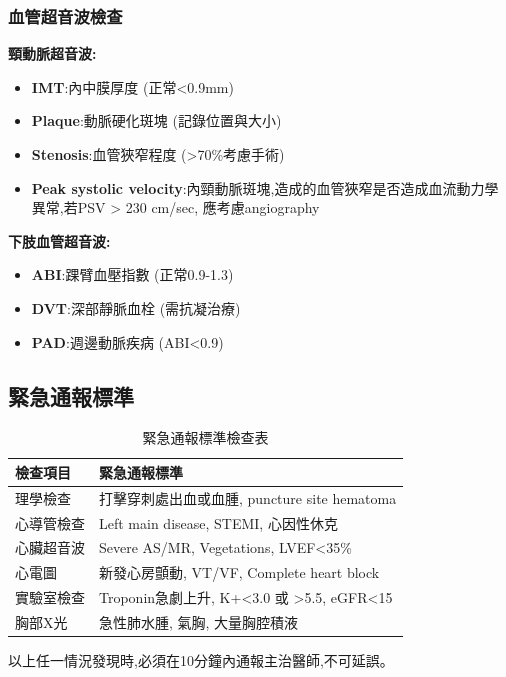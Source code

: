 \documentclass[12pt,a4paper]{article}
\newcommand{\warning}[1]{
    \par
    \noindent
    \begin{tcolorbox}[
        colback=warning_orange!5!white,
        colframe=warning_orange,
        title=\textbf{緊急通報},
        fonttitle=\bfseries,
        boxrule=1pt,
        arc=3pt,
        left=6pt,
        right=6pt,
        top=6pt,
        bottom=6pt
    ]
    #1
    \end{tcolorbox}
}
\begin{document}
\subsubsection{血管超音波檢查}
\textbf{頸動脈超音波:}
\begin{itemize}[nosep]
    \item \textbf{IMT}:內中膜厚度 (正常<0.9mm)
    \item \textbf{Plaque}:動脈硬化斑塊 (記錄位置與大小)
    \item \textbf{Stenosis}:血管狹窄程度 (>70\%考慮手術)
    \item \textbf{Peak systolic velocity}:內頸動脈斑塊,造成的血管狹窄是否造成血流動力學異常,若PSV > 230 cm/sec, 應考慮angiography
\end{itemize}

\textbf{下肢血管超音波:}
\begin{itemize}[nosep]
    \item \textbf{ABI}:踝臂血壓指數 (正常0.9-1.3)
    \item \textbf{DVT}:深部靜脈血栓 (需抗凝治療)
    \item \textbf{PAD}:週邊動脈疾病 (ABI<0.9)
\end{itemize}

\subsection{緊急通報標準}

\begin{table}[h]
    \centering
    \caption{緊急通報標準檢查表}
    \begin{tabular}{p{5cm} p{9cm}}
        \toprule
        \textbf{檢查項目} & \textbf{緊急通報標準} \\
        \midrule
        理學檢查 & 打擊穿刺處出血或血腫, puncture site hematoma \\
        心導管檢查 & Left main disease, STEMI, 心因性休克 \\
        心臟超音波 & Severe AS/MR, Vegetations, LVEF<35\% \\
        心電圖 & 新發心房顫動, VT/VF, Complete heart block \\
        實驗室檢查 & Troponin急劇上升, K+<3.0 或 >5.5, eGFR<15 \\
        胸部X光 & 急性肺水腫, 氣胸, 大量胸腔積液 \\
        \bottomrule
    \end{tabular}
\end{table}

\warning{
以上任一情況發現時,必須在10分鐘內通報主治醫師,不可延誤。
}
\end{document}
